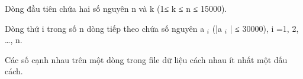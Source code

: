 Dòng đầu tiên chứa hai số nguyên n và k (1≤ k ≤ n ≤ 15000).

Dòng thứ i trong số n dòng tiếp theo chứa số nguyên a $_ i $ (|a $_ i $ | ≤ 30000), i =1, 2, …, n.

Các số cạnh nhau trên một dòng trong file dữ liệu cách nhau ít nhất một dấu cách.

\